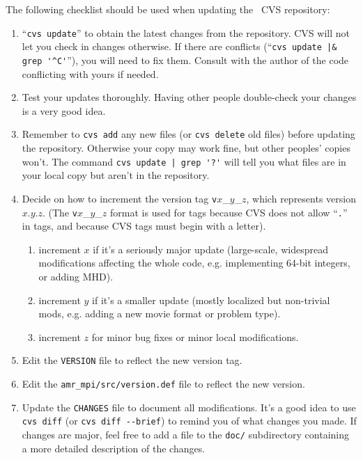 \documentclass{book}
\begin{document}
The following checklist should be used when updating the \cello\ CVS repository:

\begin{enumerate}
   \item ``\verb+cvs update+'' to obtain the latest changes from the repository.
      CVS will not let you check in changes otherwise.  If there are
      conflicts (``\verb+cvs update |& grep '^C'+''), you will need to fix
      them.  Consult with the author of the code conflicting with
      yours if needed.

   \item Test your updates thoroughly.  Having other people double-check
      your changes is a very good idea.

   \item Remember to \verb+cvs add+ any new files (or \verb+cvs delete+
    old files) before updating the repository.  Otherwise your
   copy may work fine, but other peoples' copies won't.  The command
   \verb+cvs update | grep '?'+ will tell you what files are in your
   local copy but aren't in the repository.

   \item Decide on how to increment the version tag
   \texttt{v}$x$\_$y$\_$z$, which represents version $x$.$y$.$z$.  (The
   \texttt{v}$x$\_$y$\_$z$ format is used for tags because CVS does not
   allow ``\texttt{.}'' in tags, and because CVS tags must begin with a letter).

\begin{enumerate}
      \item increment $x$ if it's a seriously major update (large-scale,
          widespread modifications affecting the whole code, e.g. 
          implementing 64-bit integers, or adding MHD).
      \item increment $y$ if it's a smaller update (mostly localized but 
          non-trivial mods, e.g. adding a new movie format or problem type).
      \item increment $z$ for minor bug fixes or minor local modifications.
\end{enumerate}

   \item Edit the \texttt{VERSION} file to reflect the new version tag.

   \item Edit the \texttt{amr\_mpi/src/version.def} file to reflect the new
      version.

   \item Update the \texttt{CHANGES} file to document all modifications.
   It's a good idea to use \texttt{cvs diff} (or \verb+cvs diff --brief+) to remind you of what changes you made.  If changes are
   major, feel free to add a file to the \texttt{doc/} subdirectory
   containing a more detailed description of the changes.


\end{enumerate}
\end{document}
